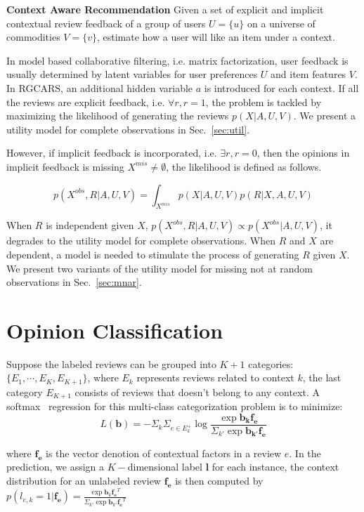 \documentclass[sigconf]{acmart}
\begin{document}
\textbf{Context Aware Recommendation} Given a set of explicit and implicit contextual review feedback of a group of users $U=\{u\}$ on a universe of commodities $V=\{v\}$, estimate how a user will like an item under a context. 


In model based collaborative filtering, i.e. matrix factorization, user feedback is usually determined by latent variables for user preferences $U$ and item features $V$. In RGCARS, an additional hidden variable $a$ is introduced for each context. If all the reviews are explicit feedback, i.e. $\forall r, r=1 $, the problem is tackled by maximizing the likelihood of generating the reviews $p(X|A,U,V)$. We present a utility model for complete observations in Sec.~\ref{sec:util}. 

However, if implicit feedback is incorporated, i.e. $\exists r, r=0$, then the opinions in implicit feedback is missing $X^{mis}\neq \emptyset$, the likelihood is defined as follows.

\begin{equation}
p(X^{obs},R|A,U,V)= \int_{X^{mis}}p(X|A,U,V)p(R|X,A,U,V)
\end{equation}   

When $R$ is independent given $X$, $p(X^{obs},R|A,U,V)\propto p(X^{obs}|A,U,V)$, it degrades to the utility model for complete observations. When $R$ and $X$ are dependent, a model is needed to stimulate the process of generating $R$ given $X$. We present two variants of the utility model for missing not at random observations in Sec.~\ref{sec:mnar}.

\section{Opinion Classification}\label{sec:classifier}

Suppose the labeled reviews can be grouped into $K+1$ categories: $\{E_1,\cdots,E_K,E_{K+1}\}$, where $E_k$ represents reviews related to context $k$, the last category $E_{K+1}$ consists of reviews that doesn't belong to any context. A softmax~\cite{Heckerman1997Models} regression for this multi-class categorization problem is to minimize:
\begin{equation}\label{equ:softmax}
  L(\mathbf{b})= -\Sigma_{k}\Sigma_{e\in E^+_k}\log \frac{\exp{\mathbf{b_k}\mathbf{f_e}}}{\Sigma_{k'} \exp{\mathbf{b_{k'}}\mathbf{f_e}}}
\end{equation}

where  $\mathbf{f_e}$ is the vector denotion of contextual factors in a review $e$. In the prediction, we assign a $K-$dimensional label $\mathbf{l}$ for each instance, the context distribution for an unlabeled review $\mathbf{f_e}$ is then computed by $p(l_{e,k}=1|\mathbf{f_e})=\frac{\exp{\mathbf{b}_k\mathbf{f_e}^T}}{\Sigma_{k'}\exp{\mathbf{b}_{k'}\mathbf{f_e}^T}}$
\end{document}
